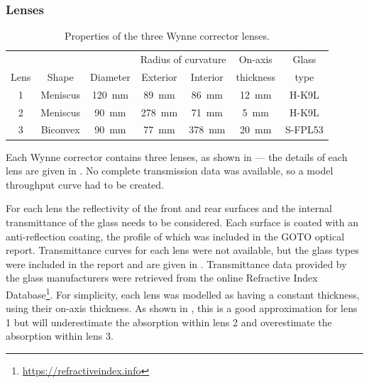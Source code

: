 \begin{colsection}
\subsubsection{Lenses}

\begin{table}[t]
    \begin{center}
        \begin{tabular}{c|ccccc|c} %
                 &       &                        & \multicolumn{2}{c}{Radius of curvature}         & On-axis               & Glass \\
            Lens & Shape & Diameter               & Exterior               & Interior               & thickness             & type \\
            \midrule
            1 & Meniscus & \SI{120}{\milli\metre} &  \SI{89}{\milli\metre} &  \SI{86}{\milli\metre} & \SI{12}{\milli\metre} & H-K9L   \\
            2 & Meniscus &  \SI{90}{\milli\metre} & \SI{278}{\milli\metre} &  \SI{71}{\milli\metre} &  \SI{5}{\milli\metre} & H-K9L   \\
            3 & Biconvex &  \SI{90}{\milli\metre} &  \SI{77}{\milli\metre} & \SI{378}{\milli\metre} & \SI{20}{\milli\metre} & S-FPL53 \\
        \end{tabular}
    \end{center}
    \caption[Wynne corrector lens properties]{
        Properties of the three Wynne corrector lenses.
    }\label{tab:lenses}
\end{table}

Each Wynne corrector contains three lenses, as shown in  --- the details of each lens are given in . No complete transmission data was available, so a model throughput curve had to be created.

For each lens the reflectivity of the front and rear surfaces and the internal transmittance of the glass needs to be considered. Each surface is coated with an anti-reflection coating, the profile of which was included in the GOTO optical report. Transmittance curves for each lens were not available, but the glass types were included in the report and are given in . Transmittance data provided by the glass manufacturers were retrieved from the online Refractive Index Database\footnote{\url{https://refractiveindex.info}}. For simplicity, each lens was modelled as having a constant thickness, using their on-axis thickness. As shown in , this is a good approximation for lens 1 but will underestimate the absorption within lens 2 and overestimate the absorption within lens 3.


\end{colsection}
